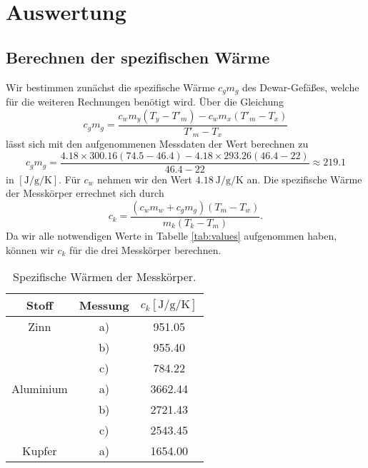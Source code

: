 \section{Auswertung}
\label{sec:Auswertung}
\subsection{Berechnen der spezifischen Wärme}
Wir bestimmen zunächst die spezifische Wärme $c_gm_g$ des Dewar-Gefäßes, welche für die weiteren Rechnungen benötigt wird.
Über die Gleichung
\begin{equation}
    c_gm_g = \frac{c_wm_y(T_y-T'_m)-c_wm_x(T'_m-T_x)}{T'_m-T_x}
\end{equation}
lässt sich mit den aufgenommenen Messdaten der Wert berechnen zu
\begin{equation}
    c_gm_g = \frac{4.18\times300.16(74.5-46.4)-4.18\times293.26(46.4-22)}{46.4-22} \approx 219.1
\end{equation}
in $[\si{\joule\per\gram\per\kelvin}]$.
Für $c_w$ nehmen wir den Wert $\SI{4.18}{\joule\per\g\per\kelvin}$ an.\cite{Versuchsanleitung}
Die spezifische Wärme der Messkörper errechnet sich durch
\begin{equation}
    c_k = \frac{(c_wm_w + c_gm_g)(T_m - T_w)}{m_k(T_k - T_m)}.
\end{equation}
Da wir alle notwendigen Werte in Tabelle \ref{tab:values} aufgenommen haben, können wir $c_k$ für die drei Messkörper berechnen.
\begin{table}
    \centering
    \caption{Spezifische Wärmen der Messkörper.}
    \label{tab:c_k-Werte}
    \begin{tabular}{c c | S[table-format=4.2]}
        \toprule
        Stoff & Messung & $c_k[\si{\joule\per\g\per\kelvin}]$ \\
        \midrule
        Zinn        & a) &   951.05 \\
                    & b) &   955.40 \\
                    & c) &   784.22 \\
        Aluminium   & a) &  3662.44 \\
                    & b) &  2721.43 \\
                    & c) &  2543.45 \\
        Kupfer      & a) &  1654.00 \\
        \bottomrule
    \end{tabular}
\end{table}

